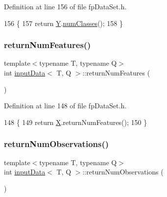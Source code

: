 Definition at line 156 of file fp\+Data\+Set.\+h.


\begin{DoxyCode}
156                              \{
157             \textcolor{keywordflow}{return} \hyperlink{classinputData_a03b936fe0070cee08153cb4853003ab4}{Y}.\hyperlink{classinputYDataClassification_ae090531ab57b174ab007a2a8248462fe}{numClasses}();
158         \}
\end{DoxyCode}
\mbox{\label{classinputData_a8fbb9ac952f73f65295eeb9bf8c3b01a}} 
\subsubsection{\texorpdfstring{return\+Num\+Features()}{returnNumFeatures()}}
{\footnotesize\ttfamily template$<$typename T, typename Q$>$ \\
int \hyperlink{classinputData}{input\+Data}$<$ T, Q $>$\+::return\+Num\+Features (\begin{DoxyParamCaption}{ }\end{DoxyParamCaption})\hspace{0.3cm}{\ttfamily [inline]}}



Definition at line 148 of file fp\+Data\+Set.\+h.


\begin{DoxyCode}
148                                       \{
149             \textcolor{keywordflow}{return} \hyperlink{classinputData_a31bffca53fea1a24c237e543cc5489a0}{X}.returnNumFeatures();
150         \}
\end{DoxyCode}
\mbox{\label{classinputData_af2ac0a8c7e0bfcdf1de1ea521eadc7af}} 
\subsubsection{\texorpdfstring{return\+Num\+Observations()}{returnNumObservations()}}
{\footnotesize\ttfamily template$<$typename T, typename Q$>$ \\
int \hyperlink{classinputData}{input\+Data}$<$ T, Q $>$\+::return\+Num\+Observations (\begin{DoxyParamCaption}{ }\end{DoxyParamCaption})\hspace{0.3cm}{\ttfamily [inline]}}



